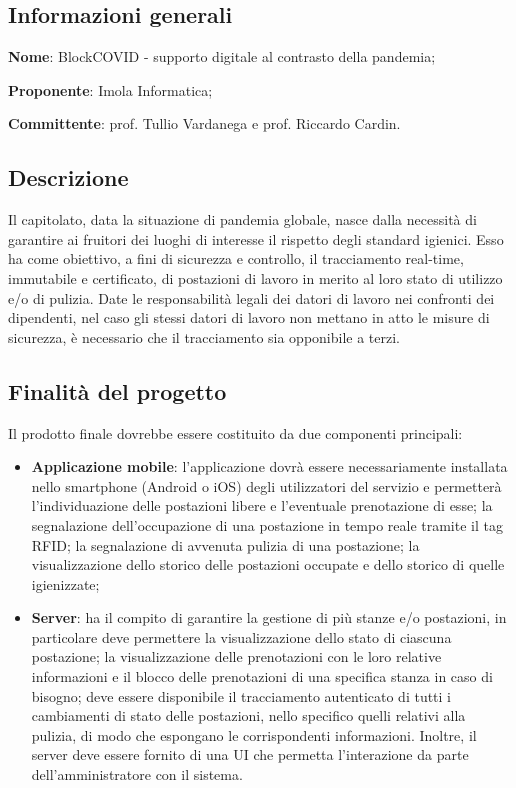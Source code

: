 \documentclass[../studio-di-fattibilita.tex]{subfiles}
\begin{document}
\subsection{Informazioni generali}%
\label{sub:informazioni_generale}
\begin{description}
  \item \textbf{Nome}: BlockCOVID - supporto digitale al contrasto della pandemia;
  \item \textbf{Proponente}: Imola Informatica;
  \item \textbf{Committente}: prof. Tullio Vardanega e prof. Riccardo Cardin.
\end{description}

\subsection{Descrizione}%
\label{sub:c1_descrizione}
Il capitolato, data la situazione di pandemia globale, nasce dalla necessità di garantire ai fruitori dei luoghi di interesse il rispetto degli standard igienici. Esso ha come obiettivo, a fini di sicurezza e controllo, il tracciamento real-time, immutabile e certificato, di postazioni di lavoro in merito al loro stato di utilizzo e/o di pulizia. Date le responsabilità legali dei datori di lavoro nei confronti dei dipendenti, nel caso gli stessi datori di lavoro non mettano in atto le misure di sicurezza, è necessario che il tracciamento sia opponibile a terzi.

\subsection{Finalità del progetto}%
\label{sub:c1_finalita_del_progetto}
Il prodotto finale dovrebbe essere costituito da due componenti principali: 
\begin{itemize}
  \item \textbf{Applicazione mobile}: l’applicazione dovrà essere necessariamente installata nello smartphone (Android o iOS) degli utilizzatori del servizio e permetterà l’individuazione delle postazioni libere e l’eventuale prenotazione di esse; la segnalazione dell’occupazione di una postazione in tempo reale tramite il tag RFID; la segnalazione di avvenuta pulizia di una postazione; la visualizzazione dello storico delle postazioni occupate e dello storico di quelle igienizzate;
  \item \textbf{Server}: ha il compito di garantire la gestione di più stanze e/o postazioni, in particolare deve permettere la visualizzazione dello stato di ciascuna postazione; la visualizzazione delle prenotazioni con le loro relative informazioni e il blocco delle prenotazioni di una specifica stanza in caso di bisogno; deve essere disponibile il tracciamento autenticato di tutti i cambiamenti di stato delle postazioni, nello specifico quelli relativi alla pulizia, di modo che espongano le corrispondenti informazioni. Inoltre, il server deve essere fornito di una UI che permetta l’interazione da parte dell’amministratore con il sistema.
\end{itemize}
\end{document}
